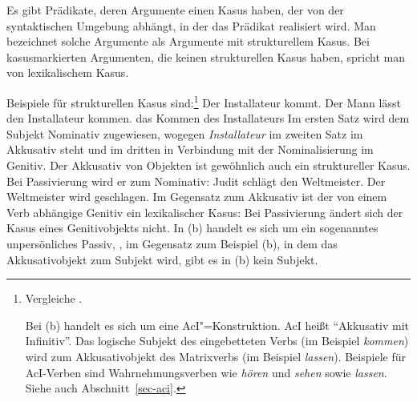 Es gibt Prädikate, deren Argumente einen Kasus haben, der von der syntaktischen Umgebung abhängt,
in der das Prädikat realisiert wird. Man bezeichnet solche Argumente
als Argumente mit strukturellem Kasus. Bei kasusmarkierten Argumenten,
die keinen strukturellen Kasus haben, spricht man von lexikalischem Kasus.

Beispiele für strukturellen Kasus sind:\footnote{
        Vergleiche .

        Bei (b) handelt es sich um eine AcI"=Konstruktion. AcI heißt "`Akkusativ mit
        Infinitiv"'. Das logische Subjekt des eingebetteten Verbs (im Beispiel \emph{kommen})
        wird zum Akkusativobjekt des Matrixverbs (im Beispiel \emph{lassen}).
        Beispiele für AcI-Verben sind Wahrnehmungsverben wie \emph{hören} und 
        \emph{sehen} sowie \emph{lassen}. Siehe auch Abschnitt~\ref{sec-aci}.
}
\eal
\ex Der Installateur kommt.
\ex Der Mann lässt den Installateur kommen.
\ex das Kommen des Installateurs
\zl
Im ersten Satz wird dem Subjekt Nominativ zugewiesen, wogegen \emph{Installateur} im
zweiten Satz im Akkusativ steht und im dritten in Verbindung mit der Nominalisierung
im Genitiv. Der Akkusativ von Objekten ist gewöhnlich auch ein struktureller Kasus. 
Bei Passivierung wird er zum Nominativ:
\eal
\ex Judit schlägt den Weltmeister.
\ex Der Weltmeister wird geschlagen.
\zl
Im Gegensatz zum Akkusativ ist der von einem Verb abhängige Genitiv ein lexikalischer Kasus:
Bei Passivierung ändert sich der Kasus eines Genitivobjekts nicht.
\eal
{}
\zl
In (b) handelt es sich um ein sogenanntes unpersönliches Passiv,
\dash, im Gegensatz zum Beispiel (b), in dem das Akkusativobjekt zum Subjekt wird, 
gibt es in (b) kein Subjekt.

